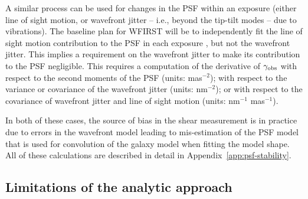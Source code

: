 \documentclass[usenatbib]{mnras}
\begin{document}
A similar process can be used for changes in the PSF within an exposure (either line of sight motion, or wavefront jitter -- i.e., beyond the tip-tilt modes -- due to vibrations). The baseline plan for WFIRST will be to independently fit the line of sight motion contribution to the PSF in each exposure \citep{2012SPIE.8442E..10J}, but not the wavefront jitter. This implies a requirement on the wavefront jitter to make its contribution to the PSF negligible. This requires a computation of the derivative of $\gamma_{\rm obs}$ with respect to the second moments of the PSF (units: mas$^{-2}$); with respect to the variance or covariance of the wavefront jitter (units: nm$^{-2}$); or with respect to the covariance of wavefront jitter and line of sight motion (units: nm$^{-1}$ mas$^{-1}$).

In both of these cases, the source of bias in the shear measurement is in practice due to errors in the wavefront model leading to mis-estimation of the PSF model that is used for convolution of the galaxy model when fitting the model shape. All of these calculations are described in detail in Appendix~\ref{app:psf-stability}.

\subsection{Limitations of the analytic approach}
\end{document}
